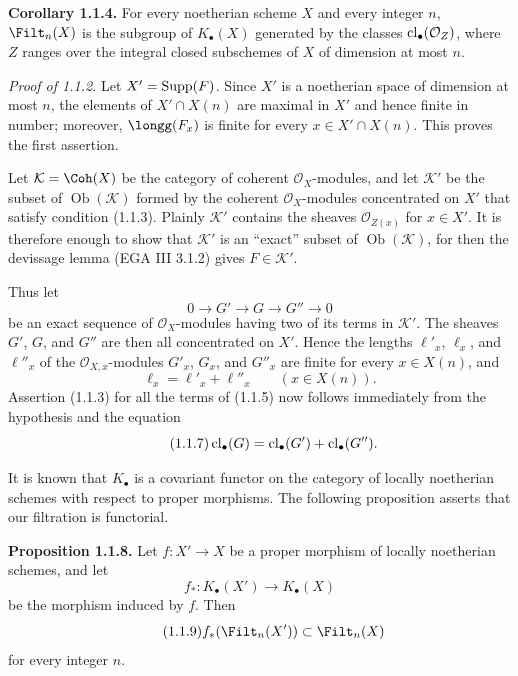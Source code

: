 \textbf{Corollary 1.1.4.}
For every noetherian scheme $X$ and every integer $n$, $\Filt_n(X)$ is the
subgroup of $K_\bullet(X)$ generated by the classes
$\operatorname{cl}_\bullet(\mathcal O_Z)$, where $Z$ ranges over the integral closed
subschemes of $X$ of dimension at most $n$.

\emph{Proof of 1.1.2.}
Let $X'=\operatorname{Supp}(F)$. Since $X'$ is a noetherian space of dimension at most $n$,
the elements of $X'\cap X(n)$ are maximal in $X'$ and hence finite in number;
moreover, $\longg(F_x)$ is finite for every $x\in X'\cap X(n)$. This proves
the first assertion.

Let $\mathcal K=\Coh(X)$ be the category of coherent $\mathcal O_X$-modules,
and let $\mathcal K'$ be the subset of $\operatorname{Ob}(\mathcal K)$ formed
by the coherent $\mathcal O_X$-modules concentrated on $X'$ that satisfy
condition (1.1.3). Plainly $\mathcal K'$ contains the sheaves
$\mathcal O_{Z(x)}$ for $x\in X'$. It is therefore enough to show that
$\mathcal K'$ is an ``exact'' subset of $\operatorname{Ob}(\mathcal K)$,
for then the devissage lemma (EGA III 3.1.2) gives $F\in\mathcal K'$.

Thus let
\begin{equation}\tag{1.1.5}
0\longrightarrow G'\longrightarrow G\longrightarrow G''\longrightarrow0
\end{equation}
be an exact sequence of $\mathcal O_X$-modules having two of its terms in
$\mathcal K'$. The sheaves $G'$, $G$, and $G''$ are then all concentrated on
$X'$. Hence the lengths $\ell'_x$, $\ell_x$, and $\ell''_x$ of the
$\mathcal O_{X,x}$-modules $G'_x$, $G_x$, and $G''_x$ are finite for every
$x\in X(n)$, and
\begin{equation}\tag{1.1.6}
\ell_x=\ell'_x+\ell''_x\qquad(x\in X(n)).
\end{equation}
Assertion (1.1.3) for all the terms of (1.1.5) now follows immediately from
the hypothesis and the equation
\begin{equation}\tag{1.1.7}
\operatorname{cl}_\bullet(G)=\operatorname{cl}_\bullet(G')+\operatorname{cl}_\bullet(G'').
\end{equation}

It is known that $K_\bullet$ is a covariant functor on the category of locally
noetherian schemes with respect to proper morphisms. The following proposition
asserts that our filtration is functorial.

\textbf{Proposition 1.1.8.}
Let $f:X'\to X$ be a proper morphism of locally noetherian schemes, and let
\[
f_*:K_\bullet(X')\longrightarrow K_\bullet(X)
\]
be the morphism induced by $f$. Then
\begin{equation}\tag{1.1.9}
f_*(\Filt_n(X'))\subset\Filt_n(X)
\end{equation}
for every integer $n$.

